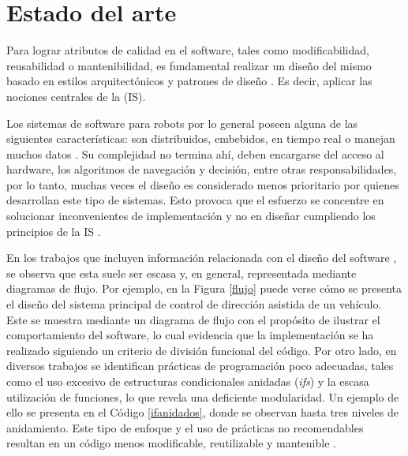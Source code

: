 %
%


\chapter{Estado del arte}
\label{estadoDelArte}


Para lograr atributos de calidad en el software, tales como modificabilidad, reusabilidad o mantenibilidad, es fundamental realizar un diseño del mismo basado en estilos arquitectónicos y patrones de diseño \cite{Gamma:1995:DPE:186897,shawgarlan,buschmann,ghezzi2003,DBLP:books/daglib/0030743,bass2003}. Es decir, aplicar las nociones centrales de la  (\gls{IS}).

Los sistemas de software para robots por lo general poseen alguna de las siguientes características: son distribuidos, embebidos, en tiempo real o manejan muchos datos \cite{noergaard2005embedded, braunl2003embedded}. Su complejidad no termina ahí, deben encargarse del acceso al hardware, los algoritmos de navegación y decisión, entre otras responsabilidades, por lo tanto, muchas veces el diseño es considerado menos prioritario por quienes desarrollan este tipo de sistemas. Esto provoca que el esfuerzo se concentre en solucionar inconvenientes de implementación y no en diseñar cumpliendo los principios de la \gls{IS} \cite{Brugali2009}.

En los trabajos que incluyen información relacionada con el diseño del software \cite{bad-desing-auto,bad-desing-implantable,code-1,code-2,Zhang2009,bad-design-uml,bad-design-robot}, se observa que esta suele ser escasa y, en general, representada mediante diagramas de flujo. Por ejemplo, en la Figura \ref{flujo} puede verse cómo se presenta el diseño del sistema principal de control de dirección asistida de un vehículo. Este se muestra mediante un diagrama de flujo con el propósito de ilustrar el comportamiento del software, lo cual evidencia que la implementación se ha realizado siguiendo un criterio de división funcional del código. Por otro lado, en diversos trabajos se identifican prácticas de programación poco adecuadas, tales como el uso excesivo de estructuras condicionales anidadas (\textit{ifs}) y la escasa utilización de funciones, lo que revela una deficiente modularidad. Un ejemplo de ello se presenta en el Código \ref{ifanidados}, donde se observan hasta tres niveles de anidamiento. Este tipo de enfoque y el uso de prácticas no recomendables resultan en un código menos modificable, reutilizable y mantenible \cite{Parnas1972}.

